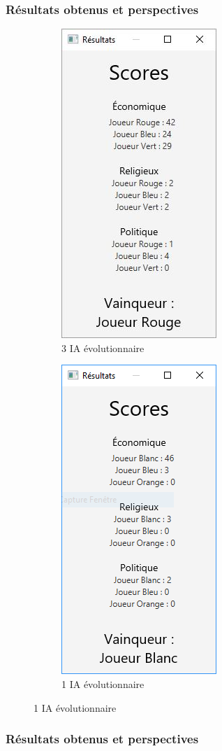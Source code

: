 \begin{frame}
	\frametitle{Résultats obtenus et perspectives}
	\begin{figure}
		\begin{subfigure}{0.5\textwidth}
			\centering
			\includegraphics[width=0.4\linewidth]{images/resultats}
			\caption{3 IA évolutionnaire}
		\end{subfigure}
		\begin{subfigure}{0.4\textwidth}
			\centering
			\includegraphics[width=0.5\linewidth]{images/score_evol_vs_random}
			\caption{1 IA évolutionnaire}
		\end{subfigure}
	\end{figure}
\end{frame}

\begin{frame}
	\frametitle{Résultats obtenus et perspectives}
	\begin{block}
		
	\end{block}
\end{frame}
